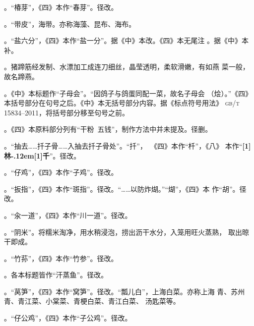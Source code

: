 \begin{list}{}
。“椿芽”，《四》本作“春芽”。径改。

。“带皮”，海带。亦称海藻、昆布、海布。

。“盐六分”，《四》本作“盐一分”。据《中》本改。《四》本无尾注%
{\footnotesize{}}。据《中》本补。

。猪蹄筋经发制、水漂加工成连刀细丝，晶莹透明，柔软滑嫩，有如燕
菜一般，故名蹄燕。

。《中》本标题作“子母会”。“因鸽子与鸽蛋同配一菜，故名子母会
（烩）。”《四》本括号部分在句号之后。《中》本无括号部分内容。据《标点符号用法》
\textsc{gb/t 15834--2011}，将括号部分移至句号之前。

。《四》本原料部分列有“干粉~五钱”，制作方法中并未提及。径删。

。“抽去……扦子骨……入抽去扦子骨处”。“扦”，~《四》本作“杄”，《八》
本作“{\bfseries\scalebox{.65}[1]{林}\kern-.12em\scalebox{.55}[1]{千}}”。径改。

。“仔鸡”，《四》本作“子鸡”。径改。

。“扳指”，《四》本作“斑指”。径改。“……以防炸煳。”“煳”，《四》本
作“胡”。径改。

。“汆一道”，《四》本作“川一道”。径改。

。“阴米”。将糯米淘净，用水稍浸泡，捞出沥干水分，入笼用旺火蒸熟，
取出晾干即成。

。“竹荪”，《四》本作“竹参”。径改。

。各本标题皆作“汗蒸鱼”。径改。

。“莴笋”，《四》本作“窝笋”。径改。“瓢儿白”，上海白菜。亦称上海
青、苏州青、青江菜、小棠菜、青梗白菜、青江白菜、 汤匙菜等。

。“仔公鸡”，《四》本作“子公鸡”。径改。

\end{list}
\endgroup%

